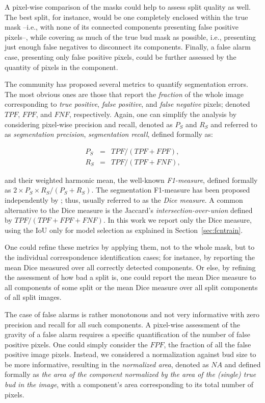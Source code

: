 \documentclass[a4paper,authoryear,review]{elsarticle}
\begin{document}
A pixel-wise comparison of the masks could help to assess split quality as well. The best split, for instance, would be one completely enclosed within the true mask --i.e., with none of its connected components presenting false positive pixels--, while covering as much of the true bud mask as possible, i.e., presenting just enough false negatives to disconnect its components. Finally, a false alarm case, presenting only false positive pixels, could be further assessed by the quantity of pixels in the component. 

The community has proposed several metrics to quantify segmentation errors. The most obvious ones are those that report the \emph{fraction} of the whole image corresponding to \emph{true positive}, \emph{false positive}, and \emph{false negative} pixels; denoted $TPF$, $FPF$, and $FNF$, respectively. Again, one can simplify the analysis by considering pixel-wise precision and recall, denoted as  $P_S$ and $R_S$ and referred to as \emph{segmentation precision}, \emph{segmentation recall}, defined formally as: 

\begin{eqnarray*} 
    P_S &=& TPF / (TPF + FPF),\\
    R_S &=& TPF / (TPF + FNF),
\end{eqnarray*}

and their weighted harmonic mean, the well-known \emph{F1-measure}, defined formally as $2 \times P_S  \times R_S / (P_S + R_S)$. The segmentation F1-measure has been proposed independently by \citet{dice1945measures}; thus, usually referred to as the \emph{Dice measure}. A common alternative to the Dice measure is the Jaccard’s \emph{intersection-over-union} \citep{jaccard1912distribution} defined by $TPF / (TPF+FPF+FNF)$.  In this work we report only the Dice measure, using the IoU only for model selection as explained in Section~\ref{sec:fcntrain}.

One could refine these metrics by applying them, not to the whole mask, but to the individual correspondence identification cases; for instance, by reporting the mean Dice measured over all correctly detected components. Or else, by refining the assessment of how bad a split is, one could report the mean Dice measure to all components of some split or the mean Dice measure over all split components of all split images. 

The case of false alarms is rather monotonous and not very informative with zero precision and recall for all such components. A pixel-wise assessment of the gravity of a false alarm requires a specific quantification of the number of false positive pixels. One could simply consider the $FPF$, the fraction of all the false positive image pixels. Instead, we considered a normalization against bud size to be more informative, resulting in the \emph{normalized area}, denoted as $NA$ and defined formally as \emph{the area of the component normalized by the area of the (single) true bud in the image}, with a component’s area  corresponding to its total number of pixels. 
\end{document}
